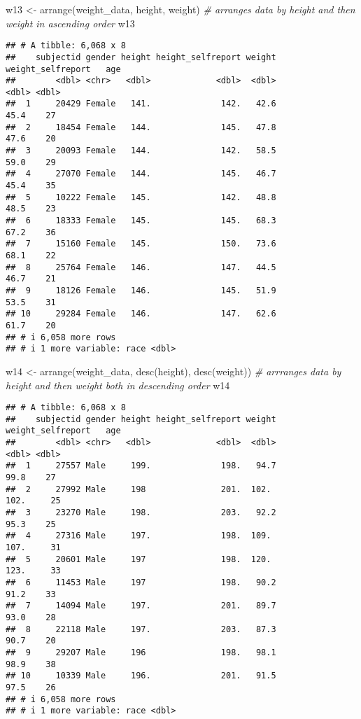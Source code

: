 \documentclass[
]{article}
\newenvironment{Shaded}{\begin{snugshade}}{\end{snugshade}}
\newcommand{\CommentTok}[1]{\textcolor[rgb]{0.56,0.35,0.01}{\textit{#1}}}
\newcommand{\FunctionTok}[1]{\textcolor[rgb]{0.00,0.00,0.00}{#1}}
\newcommand{\NormalTok}[1]{#1}
\newcommand{\OtherTok}[1]{\textcolor[rgb]{0.56,0.35,0.01}{#1}}
\begin{document}
\begin{Shaded}
\begin{Highlighting}[]
\NormalTok{w13 }\OtherTok{\textless{}{-}} \FunctionTok{arrange}\NormalTok{(weight\_data, height, weight) }\CommentTok{\# arranges data by height and then weight in ascending order}
\NormalTok{w13}
\end{Highlighting}
\end{Shaded}

\begin{verbatim}
## # A tibble: 6,068 x 8
##    subjectid gender height height_selfreport weight weight_selfreport   age
##        <dbl> <chr>   <dbl>             <dbl>  <dbl>             <dbl> <dbl>
##  1     20429 Female   141.              142.   42.6              45.4    27
##  2     18454 Female   144.              145.   47.8              47.6    20
##  3     20093 Female   144.              142.   58.5              59.0    29
##  4     27070 Female   144.              145.   46.7              45.4    35
##  5     10222 Female   145.              142.   48.8              48.5    23
##  6     18333 Female   145.              145.   68.3              67.2    36
##  7     15160 Female   145.              150.   73.6              68.1    22
##  8     25764 Female   146.              147.   44.5              46.7    21
##  9     18126 Female   146.              145.   51.9              53.5    31
## 10     29284 Female   146.              147.   62.6              61.7    20
## # i 6,058 more rows
## # i 1 more variable: race <dbl>
\end{verbatim}

\begin{Shaded}
\begin{Highlighting}[]
\NormalTok{w14 }\OtherTok{\textless{}{-}} \FunctionTok{arrange}\NormalTok{(weight\_data, }\FunctionTok{desc}\NormalTok{(height), }\FunctionTok{desc}\NormalTok{(weight)) }\CommentTok{\# arrranges data by height and then weight both in descending order}
\NormalTok{w14}
\end{Highlighting}
\end{Shaded}

\begin{verbatim}
## # A tibble: 6,068 x 8
##    subjectid gender height height_selfreport weight weight_selfreport   age
##        <dbl> <chr>   <dbl>             <dbl>  <dbl>             <dbl> <dbl>
##  1     27557 Male     199.              198.   94.7              99.8    27
##  2     27992 Male     198               201.  102.              102.     25
##  3     23270 Male     198.              203.   92.2              95.3    25
##  4     27316 Male     197.              198.  109.              107.     31
##  5     20601 Male     197               198.  120.              123.     33
##  6     11453 Male     197               198.   90.2              91.2    33
##  7     14094 Male     197.              201.   89.7              93.0    28
##  8     22118 Male     197.              203.   87.3              90.7    20
##  9     29207 Male     196               198.   98.1              98.9    38
## 10     10339 Male     196.              201.   91.5              97.5    26
## # i 6,058 more rows
## # i 1 more variable: race <dbl>
\end{verbatim}
\end{document}
